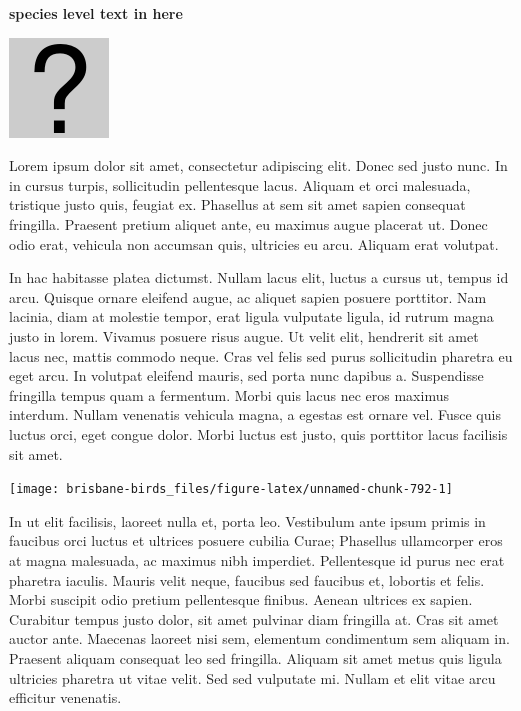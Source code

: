 \documentclass[]{book}
\let\origfigure\figure
\let\endorigfigure\endfigure
\renewenvironment{figure}[1][2] {
  \expandafter\origfigure\expandafter[H]
} {
  \endorigfigure
}
\begin{document}
\textbf{species level text in here}

\begin{figure}
\centering
\includegraphics{assets/missing.png}
\caption{No image for species}
\end{figure}

Lorem ipsum dolor sit amet, consectetur adipiscing elit. Donec sed justo
nunc. In in cursus turpis, sollicitudin pellentesque lacus. Aliquam et
orci malesuada, tristique justo quis, feugiat ex. Phasellus at sem sit
amet sapien consequat fringilla. Praesent pretium aliquet ante, eu
maximus augue placerat ut. Donec odio erat, vehicula non accumsan quis,
ultricies eu arcu. Aliquam erat volutpat.

In hac habitasse platea dictumst. Nullam lacus elit, luctus a cursus ut,
tempus id arcu. Quisque ornare eleifend augue, ac aliquet sapien posuere
porttitor. Nam lacinia, diam at molestie tempor, erat ligula vulputate
ligula, id rutrum magna justo in lorem. Vivamus posuere risus augue. Ut
velit elit, hendrerit sit amet lacus nec, mattis commodo neque. Cras vel
felis sed purus sollicitudin pharetra eu eget arcu. In volutpat eleifend
mauris, sed porta nunc dapibus a. Suspendisse fringilla tempus quam a
fermentum. Morbi quis lacus nec eros maximus interdum. Nullam venenatis
vehicula magna, a egestas est ornare vel. Fusce quis luctus orci, eget
congue dolor. Morbi luctus est justo, quis porttitor lacus facilisis sit
amet.

\begin{figure}
\texttt{[image: brisbane-birds\_files/figure-latex/unnamed-chunk-792-1]} \caption{insert figure caption}\label{fig:unnamed-chunk-792}
\end{figure}

In ut elit facilisis, laoreet nulla et, porta leo. Vestibulum ante ipsum
primis in faucibus orci luctus et ultrices posuere cubilia Curae;
Phasellus ullamcorper eros at magna malesuada, ac maximus nibh
imperdiet. Pellentesque id purus nec erat pharetra iaculis. Mauris velit
neque, faucibus sed faucibus et, lobortis et felis. Morbi suscipit odio
pretium pellentesque finibus. Aenean ultrices ex sapien. Curabitur
tempus justo dolor, sit amet pulvinar diam fringilla at. Cras sit amet
auctor ante. Maecenas laoreet nisi sem, elementum condimentum sem
aliquam in. Praesent aliquam consequat leo sed fringilla. Aliquam sit
amet metus quis ligula ultricies pharetra ut vitae velit. Sed sed
vulputate mi. Nullam et elit vitae arcu efficitur venenatis.
\end{document}
